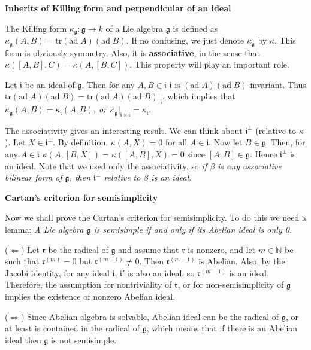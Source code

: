 \documentclass{article}
\newcommand{\NaN}{\mathbb{N}}
\newcommand{\tr}[1]{\mathrm{tr}#1}
\newcommand{\lie}[1]{\mathfrak{#1}}
\newcommand{\ad}[1]{\mathrm{ad}\; #1}
\begin{document}
\newpage

\textbf{Inherits of Killing form and perpendicular of an ideal}

The Killing form $\kappa_{\lie{g}} : \lie{g} \to k$ of a Lie algebra $\lie{g}$ is defined as $\kappa_{\lie{g}} (A, B) = \tr{(\ad{A})(\ad{B})}$.
If no confusing, we just denote $\kappa_{\lie{g}}$ by $\kappa$.
This form is obviously symmetry.
Also, it is \textbf{associative}, in the sense that $\kappa([A, B], C) = \kappa(A, [B, C])$.
This property will play an important role.

Let $\lie{i}$ be an ideal of $\lie{g}$.
Then for any $A, B \in \lie{i}$ $\lie{i}$ is $(\ad{A})(\ad{B})$-invariant.
Thus $\tr{(\ad{A})(\ad{B})} = \tr{(\ad{A})(\ad{B})|_{\lie{i}}}$, which implies that \textit{$\kappa_{\lie{g}} (A, B) = \kappa_{\lie{i}} (A, B)$, or $\kappa_{\lie{g}}|_{\lie{i} \times \lie{i}} = \kappa_{\lie{i}}$}.

The associativity gives an interesting result.
We can think about $\lie{i}^\perp$ (relative to $\kappa$).
Let $X \in \lie{i}^\perp$.
By definition, $\kappa(A, X) = 0$ for all $A \in \lie{i}$.
Now let $B \in \lie{g}$.
Then, for any $A \in \lie{i}$ $\kappa(A, [B, X]) = \kappa([A, B], X) = 0$ since $[A, B] \in \lie{g}$.
Hence $\lie{i}^\perp$ is an ideal.
Note that we used only the associativity, so \textit{if $\beta$ is any associative bilinear form of $\lie{g}$, then $\lie{i}^\perp$ relative to $\beta$ is an ideal}.

\newpage

\textbf{Cartan's criterion for semisimplicity}

Now we shall prove the Cartan's criterion for semisimplicity.
To do this we need a lemma: \textit{A Lie algebra $\lie{g}$ is semisimple if and only if its Abelian ideal is only 0}.

($\Leftarrow$) Let $\lie{r}$ be the radical of $\lie{g}$ and assume that $\lie{r}$ is nonzero, and let $m \in \NaN$ be such that $\lie{r}^{(m)} = 0$ but $\lie{r}^{(m-1)} \ne 0$.
Then $\lie{r}^{(m-1)}$ is Abelian.
Also, by the Jacobi identity, for any ideal $\lie{i}$, $\lie{i}'$ is also an ideal, so $\lie{r}^{(m-1)}$ is an ideal.
Therefore, the assumption for nontriviality of $\lie{r}$, or for non-semisimplicity of $\lie{g}$ implies the existence of nonzero Abelian ideal.

($\Rightarrow$) Since Abelian algebra is solvable, Abelian ideal can be the radical of $\lie{g}$, or at least is contained in the radical of $\lie{g}$, which means that if there is an Abelian ideal then $\lie{g}$ is not semisimple.
\end{document}
